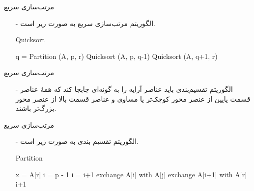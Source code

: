 \begin{frame}{‌مرتب‌سازی سریع}
\begin{itemize}\itemr
\item[-]
الگوریتم مرتب‌سازی سریع به صورت زیر است.
\begin{algorithm}[H]\alglr
  \caption{Quicksort} 
  \begin{algorithmic}[1]
           \State q = Partition (A, p, r)
           \State Quicksort (A, p, q-1) 
           \State Quicksort (A, q+1, r) 
    \EndIf                           
  \end{algorithmic}
  \label{alg:merge}
\end{algorithm}
\end{itemize}
\end{frame}


\begin{frame}{‌مرتب‌سازی سریع}
\begin{itemize}\itemr
\item[-]
الگوریتم تقسیم‌بندی
باید عناصر آرایه را به گونه‌ای جابجا کند که همهٔ عناصر قسمت پایین از عنصر محور کوچک‌تر یا مساوی و عناصر قسمت بالا از عنصر محور بزرگ‌تر باشند.
\end{itemize}
\end{frame}


\begin{frame}{‌مرتب‌سازی سریع}
\begin{itemize}\itemr
\item[-]
الگوریتم تقسیم بندی به صورت زیر است.
\begin{algorithm}[H]\alglr
  \caption{Partition} 
  \begin{algorithmic}[1]
   \State x = A[r] 
   \State i = p - 1 
    
         
            \State i = i+1 
            \State exchange A[i] with A[j] 
        \EndIf
   \EndFor 
   \State exchange A[i+1] with A[r] 
   \State \Return i+1 
  \end{algorithmic}
  \label{alg:merge}
\end{algorithm}
\end{itemize}
\end{frame}


